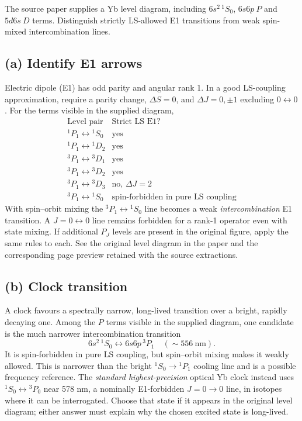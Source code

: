 The source paper supplies a Yb level diagram, including
\(6s^2\,{}^1S_0\), \(6s6p\ P\) and \(5d6s\ D\) terms.
Distinguish strictly LS-allowed E1 transitions from weak
spin-mixed intercombination lines.
\subsection*{(a) Identify E1 arrows}
Electric dipole (E1) has odd parity and angular rank 1.
In a good LS-coupling approximation, require a parity
change, \(\Delta S=0\), and \(\Delta J=0,\pm1\)
excluding \(0\leftrightarrow0\).
For the terms visible in the supplied diagram,
\[
\begin{array}{l|l}
\text{Level pair}&\text{Strict LS E1?}\\\hline
{}^1P_1\leftrightarrow{}^1S_0&\text{yes}\\
{}^1P_1\leftrightarrow{}^1D_2&\text{yes}\\
{}^3P_1\leftrightarrow{}^3D_1&\text{yes}\\
{}^3P_1\leftrightarrow{}^3D_2&\text{yes}\\
{}^3P_1\leftrightarrow{}^3D_3&\text{no, }\Delta J=2\\
{}^3P_1\leftrightarrow{}^1S_0&
\text{spin-forbidden in pure LS coupling}
\end{array}
\]
With spin--orbit mixing the
\({}^3P_1\leftrightarrow{}^1S_0\) line becomes
a weak \emph{intercombination} E1 transition.
A \(J=0\leftrightarrow0\) line remains forbidden
for a rank-1 operator even with state mixing.
If additional \(P_J\) levels are present in the
original figure, apply the same rules to each.
See the original level diagram in the paper and
the corresponding page preview retained with
the source extractions.

\subsection*{(b) Clock transition}
A clock favours a spectrally narrow, long-lived
transition over a bright, rapidly decaying one.
Among the \(P\) terms visible in the supplied
diagram, one candidate is the much narrower
intercombination transition
\[
\boxed{6s^2\,{}^1S_0\longleftrightarrow
6s6p\,{}^3P_1\quad(\sim556~\mathrm{nm})}.
\]
It is spin-forbidden in pure LS coupling, but
spin--orbit mixing makes it weakly allowed.
This is narrower than the bright
\({}^1S_0\to{}^1P_1\) cooling line and is
a possible frequency reference. The
\emph{standard highest-precision} optical Yb
clock instead uses
\({}^1S_0\leftrightarrow{}^3P_0\) near 578 nm,
a nominally E1-forbidden \(J=0\to0\) line,
in isotopes where it can be interrogated.
Choose that state if it appears in the original
level diagram; either answer must explain
why the chosen excited state is long-lived.


